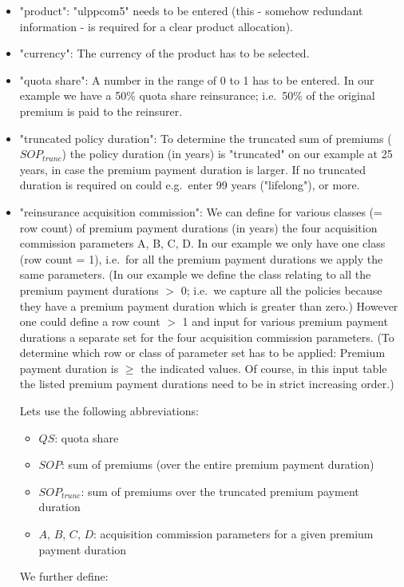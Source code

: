 \begin{itemize}
	\item	"product": "ulppcom5" needs to be entered (this - somehow redundant information - is required for a clear product allocation).
	\item "currency": The currency of the product has to be selected.
	\item "quota share": A number in the range of 0 to 1 has to be entered. In our example we have a 50\% quota share reinsurance; i.e.~50\% of the original premium is paid to the reinsurer.
	\item "truncated policy duration": To determine the truncated sum of premiums ($SOP_{trunc}$) the policy duration (in years) is "truncated" on our example at 25 years, in case the premium payment duration is larger. If no truncated duration is required on could e.g.~enter 99 years ("lifelong"), or more.
	\item "reinsurance acquisition commission": We can define for various classes (= row count) of premium payment durations (in years) the four acquisition commission parameters A, B, C, D. In our example we only have one class (row count = 1), i.e.~for all the premium payment durations we apply the same parameters. (In our example we define the class relating to all the premium payment durations $>$ 0; i.e.~we capture all the policies because they have a premium payment duration which is greater than zero.) However one could define a row count $>$ 1 and input for various premium payment durations a separate set for the four acquisition commission parameters. (To determine which row or class of parameter set has to be applied: Premium payment duration is $\geq$ the indicated values. Of course, in this input table the listed premium payment durations need to be in strict increasing order.)
	
Lets use the following abbreviations:
\begin{itemize}
	\item $QS$:  quota share
	\item $SOP$:  sum of premiums (over the entire premium payment duration)
	\item $SOP_{trunc}$:  sum of premiums over the truncated premium payment duration
	\item $A$, $B$, $C$, $D$:  acquisition commission parameters for a given premium payment duration
\end{itemize}
We further define: 


\end{itemize}
